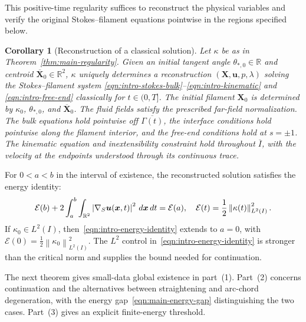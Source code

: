 \documentclass[11pt,reqno]{amsart}
\theoremstyle{plain}
\newtheorem{corollary}[theorem]{Corollary}
\theoremstyle{definition}
\numberwithin{equation}{section}
\newcommand{\grad}[1]{\nabla #1}
\newcommand{\mc}[1]{\mathcal{#1}}
\newcommand{\bm}[1]{\boldsymbol{#1}}
\newcommand{\abs}[1]{\left\lvert #1 \right\rvert}
\newcommand{\norm}[1]{\left\lVert #1 \right\rVert}
\newcommand{\R}{\mathbb{R}}
\begin{document}
This positive-time regularity suffices to reconstruct the physical variables
and verify the original Stokes--filament equations pointwise in the regions
specified below.

\begin{corollary}[Reconstruction of a classical solution]\label{cor:main-reconstruction}
Let $\kappa$ be as in Theorem~\ref{thm:main-regularity}.
Given an initial tangent angle $\theta_{*,0}\in\R$ and
centroid $\overline{\bm X}_0\in\R^2$, $\kappa$ uniquely
determines a reconstruction $(\bm X,\bm u,p,\lambda)$ solving
the Stokes--filament system
\eqref{eqn:intro-stokes-bulk}--\eqref{eqn:intro-kinematic} and \eqref{eqn:intro-free-end}
classically for $t\in(0,T]$. The initial filament $\bm X_0$ is determined
by $\kappa_0$, $\theta_{*,0}$, and $\overline{\bm X}_0$.
The fluid fields satisfy the prescribed far-field normalization.
The bulk equations hold pointwise off $\overline{\Gamma(t)}$, the
interface conditions hold pointwise along the filament
interior, and the free-end conditions hold at $s=\pm1$.
The kinematic equation and inextensibility constraint hold
throughout $\overline I$, with the velocity at the endpoints
understood through its continuous trace.
\end{corollary}


For $0<a<b$ in the interval of existence, the reconstructed solution satisfies the energy identity:
\begin{equation}\label{eqn:intro-energy-identity}
    \mc E(b)
    +2\int_a^b\int_{\R^2}
        \abs{\grad_S\bm u(\bm x,t)}^2\,d\bm x\,dt
    =\mc E(a),
    \quad \mc E(t)=\frac12\norm{\kappa(t)}_{L^2(I)}^2.
\end{equation}
If $\kappa_0\in L^2(I)$, then~\eqref{eqn:intro-energy-identity} extends to
$a=0$, with $\mc E(0)=\frac12\norm{\kappa_0}_{L^2(I)}^2$.
The $L^2$ control in~\eqref{eqn:intro-energy-identity} is stronger than the
critical norm and supplies the bound needed for continuation.

The next theorem gives small-data global existence in part~(1).
Part~(2) concerns continuation and the alternatives between straightening
and arc-chord degeneration, with the energy gap~\eqref{eqn:main-energy-gap}
distinguishing the two cases. Part~(3) gives an explicit finite-energy threshold.
\end{document}
